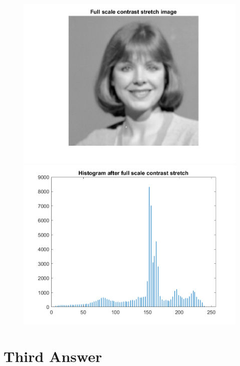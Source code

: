 \documentclass[11pt]{article} %
\begin{document}
\begin{figure}
\centering
	\includegraphics{Contrast_Image.png}
	\includegraphics{Contrasted_Hist.png}
\end{figure}
\clearpage

\section {Third Answer}
\end{document}
